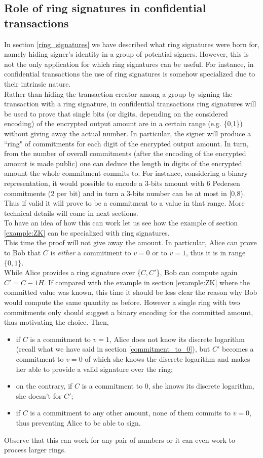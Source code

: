 \subsection{Role of ring signatures in confidential transactions}
\label{role_ring_sign_in_CT}
In section \ref{ring_signatures} we have described what ring signatures were born for, namely hiding signer's identity in a group of potential signers. However, this is not the only application for which ring signatures can be useful. For instance, in confidential transactions the use of ring signatures is somehow specialized due to their intrinsic nature.\\
Rather than hiding the transaction creator among a group by signing the transaction with a ring signature, in confidential transactions ring signatures will be used to prove that single bits (or digits, depending on the considered encoding) of the encrypted output amount are in a certain range (e.g. \{0,1\}) without giving away the actual number. In particular, the signer will produce a ``ring" of commitments for each digit of the encrypted output amount. In turn, from the number of overall commitments (after the encoding of the encrypted amount is made public) one can deduce the length in digits of the encrypted amount the whole commitment commits to. For instance, considering a binary representation, it would possible to encode a 3-bits amount with 6 Pedersen commitments (2 per bit) and in turn a 3-bits number can be at most in [0,8). Thus if valid it will prove to be a commitment to a value in that range. More technical details will come in next sections.\\
To have an idea of how this can work let us see how the example of section \ref{example:ZK} can be specialized with ring signatures.\\
This time the proof will not give away the amount. In particular, Alice can prove to Bob that $C$ is \textit{either} a commitment to $v=0$ or to $v=1$, thus it is in range $\{0,1\}$.\\
While Alice provides a ring signature over \{$C, C'$\}, Bob can compute again $C' = C - 1H$. If compared with the example in section \ref{example:ZK} where the committed value was known, this time it should be less clear the reason why Bob would compute the same quantity as before. However a single ring with two commitments only should suggest a binary encoding for the committed amount, thus motivating the choice. Then,
\begin{itemize}
    \item if $C$ is a commitment to $v=1$, Alice does not know its discrete logarithm (recall what we have said in section \ref{commitment_to_0}), but $C'$ becomes a commitment to $v=0$ of which she knows the discrete logarithm and makes her able to provide a valid signature over the ring;
    \item on the contrary, if $C$ is a commitment to 0, she knows its discrete logarithm, she doesn’t for $C'$;
    \item if $C$ is a commitment to any other amount, none of them commits to $v=0$, thus preventing Alice to be able to sign.
\end{itemize}
Observe that this can work for any pair of numbers or it can even work to process larger rings.

